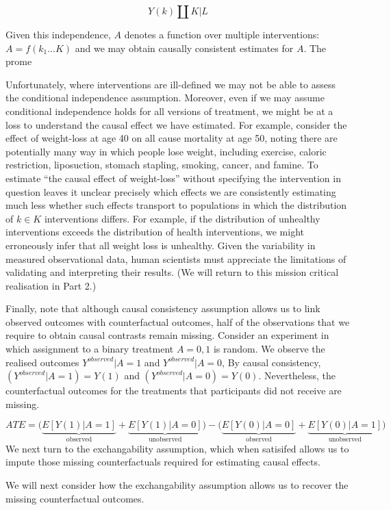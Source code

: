 \documentclass[
  singlecolumn]{report}
\begin{document}
\[Y(k) \coprod K | L\]

Given this independence, \(A\) denotes a function over multiple
interventions: \(A = f(k_1\dots K)\) and we may obtain causally
consistent estimates for \(A\). The prome

Unfortunately, where interventions are ill-defined we may not be able to
assess the conditional independence assumption. Moreover, even if we may
assume conditional independence holds for all versions of treatment, we
might be at a loss to understand the causal effect we have estimated.
For example, consider the effect of weight-loss at age 40 on all cause
mortality at age 50, noting there are potentially many way in which
people lose weight, including exercise, caloric restriction,
liposuction, stomach stapling, smoking, cancer, and famine. To estimate
``the causal effect of weight-loss'' without specifying the intervention
in question leaves it unclear precisely which effects we are
consistently estimating much less whether such effects transport to
populations in which the distribution of \(k \in K\) interventions
differs. For example, if the distribution of unhealthy interventions
exceeds the distribution of health interventions, we might erroneously
infer that all weight loss is unhealthy. Given the variability in
measured observational data, human scientists must appreciate the
limitations of validating and interpreting their results. (We will
return to this mission critical realisation in Part 2.)

Finally, note that although causal consistency assumption allows us to
link observed outcomes with counterfactual outcomes, half of the
observations that we require to obtain causal contrasts remain missing.
Consider an experiment in which assignment to a binary treatment
\(A = {0,1}\) is random. We observe the realised outcomes
\(Y^{observed}|A = 1\) and \(Y^{observed}|A = 0\), By causal
consistency, \((Y^{observed}|A = 1) = Y(1)\) and
\((Y^{observed}|A = 0) = Y(0)\). Nevertheless, the counterfactual
outcomes for the treatments that participants did not receive are
missing.

\[
ATE = \bigg(\underbrace{E[Y(1)|A = 1]}_\text{observed} + \underbrace{E[Y(1)|A = 0]}_\text{unobserved}\bigg) - \bigg(\underbrace{E[Y(0)|A = 0]}_\text{observed}  + \underbrace{E[Y(0)|A = 1]}_\text{unobserved}\bigg)
\] We next turn to the exchangability assumption, which when satisifed
allows us to impute those missing counterfactuals required for
estimating causal effects.

We will next consider how the exchangability assumption allows us to
recover the missing counterfactual outcomes.
\end{document}
